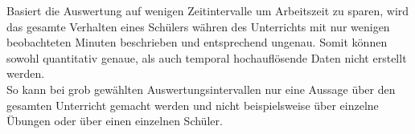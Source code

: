 Basiert die Auswertung auf wenigen Zeitintervalle um Arbeitszeit zu sparen, wird das gesamte Verhalten eines Schülers währen des Unterrichts mit nur wenigen beobachteten Minuten beschrieben und entsprechend ungenau. Somit können sowohl quantitativ genaue, als auch temporal hochauflösende Daten nicht erstellt werden.\\
So kann bei grob gewählten Auswertungsintervallen nur eine Aussage über den gesamten Unterricht gemacht werden und nicht beispielsweise über einzelne Übungen oder über einen einzelnen Schüler.